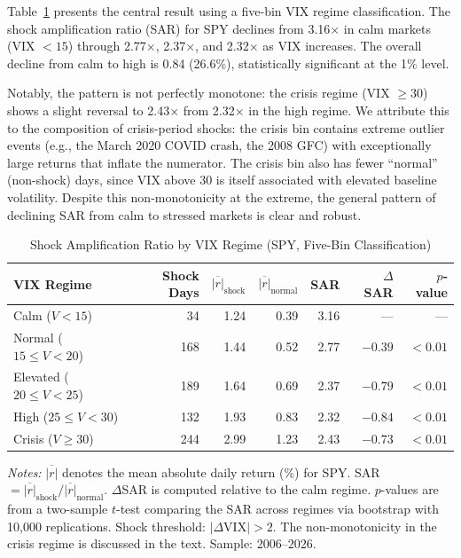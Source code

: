 \documentclass[12pt,a4paper]{article}
\begin{document}
Table~\ref{tab:absorption_core} presents the central result using a five-bin VIX regime classification. The shock amplification ratio (SAR) for SPY declines from 3.16$\times$ in calm markets (VIX $< 15$) through 2.77$\times$, 2.37$\times$, and 2.32$\times$ as VIX increases. The overall decline from calm to high is 0.84 (26.6\%), statistically significant at the 1\% level.

Notably, the pattern is not perfectly monotone: the crisis regime (VIX $\geq 30$) shows a slight reversal to 2.43$\times$ from 2.32$\times$ in the high regime. We attribute this to the composition of crisis-period shocks: the crisis bin contains extreme outlier events (e.g., the March 2020 COVID crash, the 2008 GFC) with exceptionally large returns that inflate the numerator. The crisis bin also has fewer ``normal'' (non-shock) days, since VIX above 30 is itself associated with elevated baseline volatility. Despite this non-monotonicity at the extreme, the general pattern of declining SAR from calm to stressed markets is clear and robust.

\begin{table}[H]
\centering
\caption{Shock Amplification Ratio by VIX Regime (SPY, Five-Bin Classification)}
\label{tab:absorption_core}
\begin{threeparttable}
\begin{tabular}{lrrrrrr}
\toprule
VIX Regime & Shock Days & $\overline{|r|}_{\text{shock}}$ & $\overline{|r|}_{\text{normal}}$ & SAR & $\Delta$ SAR & $p$-value \\
\midrule
Calm ($V < 15$)              & 34  & 1.24 & 0.39 & 3.16 & ---     & ---       \\
Normal ($15 \leq V < 20$)    & 168 & 1.44 & 0.52 & 2.77 & $-0.39$ & $< 0.01$ \\
Elevated ($20 \leq V < 25$)  & 189 & 1.64 & 0.69 & 2.37 & $-0.79$ & $< 0.01$ \\
High ($25 \leq V < 30$)      & 132 & 1.93 & 0.83 & 2.32 & $-0.84$ & $< 0.01$ \\
Crisis ($V \geq 30$)         & 244 & 2.99 & 1.23 & 2.43 & $-0.73$ & $< 0.01$ \\
\bottomrule
\end{tabular}
\begin{tablenotes}
\small
\item \textit{Notes:} $\overline{|r|}$ denotes the mean absolute daily return (\%) for SPY. SAR $= \overline{|r|}_{\text{shock}} / \overline{|r|}_{\text{normal}}$. $\Delta$SAR is computed relative to the calm regime. $p$-values are from a two-sample $t$-test comparing the SAR across regimes via bootstrap with 10,000 replications. Shock threshold: $|\Delta\text{VIX}| > 2$. The non-monotonicity in the crisis regime is discussed in the text. Sample: 2006--2026.
\end{tablenotes}
\end{threeparttable}
\end{table}
\end{document}
